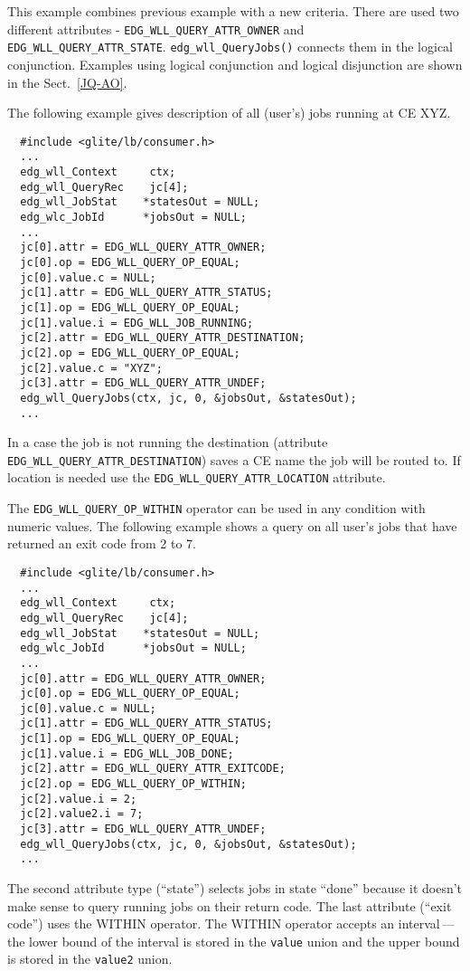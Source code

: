 This example combines previous example with a new criteria. There are used two different attributes
 - \texttt{EDG\_WLL\_QUERY\_ATTR\_OWNER} and \texttt{EDG\_WLL\_QUERY\_ATTR\_STATE}.
\texttt{edg\_wll\_QueryJobs()} connects them in the logical conjunction.
Examples using logical conjunction and logical disjunction are shown in the Sect.~\ref{JQ-AO}.

The following example gives description of all (user's) jobs running at CE XYZ.
\begin{verbatim}
  #include <glite/lb/consumer.h>
  ...
  edg_wll_Context     ctx;    
  edg_wll_QueryRec    jc[4];
  edg_wll_JobStat    *statesOut = NULL;
  edg_wlc_JobId      *jobsOut = NULL;
  ...
  jc[0].attr = EDG_WLL_QUERY_ATTR_OWNER;
  jc[0].op = EDG_WLL_QUERY_OP_EQUAL;
  jc[0].value.c = NULL;
  jc[1].attr = EDG_WLL_QUERY_ATTR_STATUS;
  jc[1].op = EDG_WLL_QUERY_OP_EQUAL;
  jc[1].value.i = EDG_WLL_JOB_RUNNING;
  jc[2].attr = EDG_WLL_QUERY_ATTR_DESTINATION;
  jc[2].op = EDG_WLL_QUERY_OP_EQUAL;
  jc[2].value.c = "XYZ";
  jc[3].attr = EDG_WLL_QUERY_ATTR_UNDEF;
  edg_wll_QueryJobs(ctx, jc, 0, &jobsOut, &statesOut);
  ...
\end{verbatim}

In a case the job is not running the destination (attribute \texttt{EDG\_WLL\_QUERY\_ATTR\_DESTINATION})
saves a CE name the job will be routed to. If location is needed use the \texttt{EDG\_WLL\_QUERY\_ATTR\_LOCATION} attribute.


The \texttt{EDG\_WLL\_QUERY\_OP\_WITHIN} operator can be used in any condition with numeric values.
The following example shows a query on all user's jobs that have returned 
an exit code from 2 to 7.
\begin{verbatim}
  #include <glite/lb/consumer.h>
  ...
  edg_wll_Context     ctx;    
  edg_wll_QueryRec    jc[4];
  edg_wll_JobStat    *statesOut = NULL;
  edg_wlc_JobId      *jobsOut = NULL;
  ...
  jc[0].attr = EDG_WLL_QUERY_ATTR_OWNER;
  jc[0].op = EDG_WLL_QUERY_OP_EQUAL;
  jc[0].value.c = NULL;
  jc[1].attr = EDG_WLL_QUERY_ATTR_STATUS;
  jc[1].op = EDG_WLL_QUERY_OP_EQUAL;
  jc[1].value.i = EDG_WLL_JOB_DONE;
  jc[2].attr = EDG_WLL_QUERY_ATTR_EXITCODE;
  jc[2].op = EDG_WLL_QUERY_OP_WITHIN;
  jc[2].value.i = 2;
  jc[2].value2.i = 7;
  jc[3].attr = EDG_WLL_QUERY_ATTR_UNDEF;
  edg_wll_QueryJobs(ctx, jc, 0, &jobsOut, &statesOut);
  ...
\end{verbatim}

The second attribute type (``state'') selects jobs in state ``done'' because it doesn't
make sense to query running jobs on their return code.
The last attribute (``exit code'') uses the WITHIN operator. The WITHIN operator accepts an
interval\,---\,the lower bound of the interval is stored in the \texttt{value} union and the
upper bound is stored in the \texttt{value2} union.

